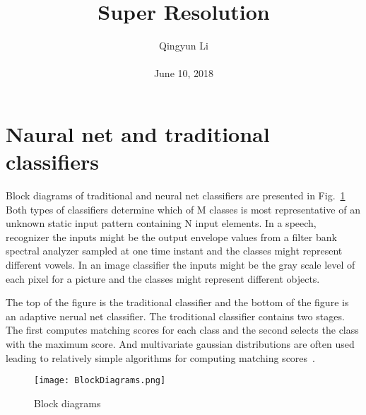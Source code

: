 \documentclass[10pt,twocolumn,letterpaper]{article}
\begin{document}
\author{Qingyun Li\\\\
June 10, 2018}        
\title{Super Resolution}

\maketitle
\section{Naural net and traditional classifiers}
\par Block diagrams of traditional and neural net classifiers are presented in Fig.~\ref{block} Both types of classifiers determine which of M classes is most representative of an unknown static input pattern containing N input elements. In a speech, recognizer the inputs might be the output envelope values from a filter bank spectral analyzer sampled at one time instant and the classes might represent different vowels. In an image classifier the inputs might be the gray scale level of each pixel for a picture and the classes might represent different objects.
\par The top of the figure is the traditional classifier and the bottom of the figure is an adaptive nerual net classifier. The troditional classifier contains two stages. The first computes matching scores for each class and the second selects the class with the maximum score. And multivariate gaussian distributions are often used leading to relatively simple algorithms for computing matching scores~\cite{elman1988learning}.
 \begin{figure}[htbp]
 \centering{}
\texttt{[image: BlockDiagrams.png]}\\
 \caption{Block diagrams}
\label{block}
\end{figure}
 
 
\end{document}
